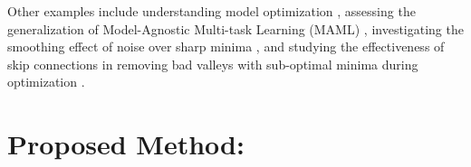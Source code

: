 \documentclass[letterpaper]{article} %
\begin{document}
            Other examples include understanding model optimization \cite{pmlr-v137-huang20a, ma2022beyond, keskar2017on, 9194023, yang2021taxonomizing}, assessing the generalization of Model-Agnostic Multi-task Learning (MAML) \cite{guiroy2019understanding}, investigating the smoothing effect of noise over sharp minima \cite{wen2018smoothout}, and studying the effectiveness of skip connections in removing bad valleys with sub-optimal minima during optimization \cite{nguyen2019optimization}.



  \section{Proposed Method: \proposedautencoder{}} \label{se:proposedlandscape}
\end{document}
